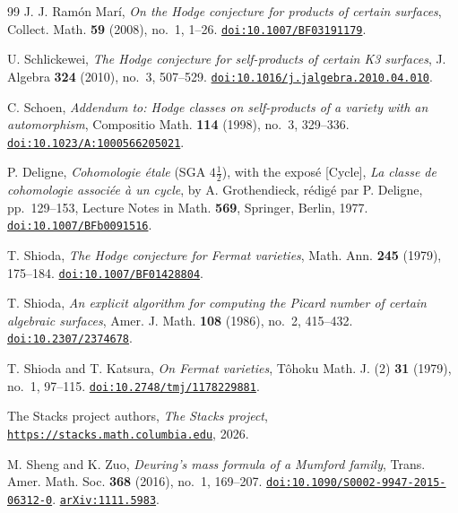 \begin{thebibliography}{99}
J. J. Ram\'on Mar\'i,
\emph{On the Hodge conjecture for products of certain surfaces},
Collect. Math. \textbf{59} (2008), no.~1, 1--26.
\href{https://doi.org/10.1007/BF03191179}{\texttt{doi:10.1007/BF03191179}}.

U. Schlickewei,
\emph{The Hodge conjecture for self-products of certain K3 surfaces},
J. Algebra \textbf{324} (2010), no.~3, 507--529.
\href{https://doi.org/10.1016/j.jalgebra.2010.04.010}{\texttt{doi:10.1016/j.jalgebra.2010.04.010}}.

C. Schoen,
\emph{Addendum to: Hodge classes on self-products of a variety with an
automorphism},
Compositio Math. \textbf{114} (1998), no.~3, 329--336.
\href{https://doi.org/10.1023/A:1000566205021}{\texttt{doi:10.1023/A:1000566205021}}.

P. Deligne,
\emph{Cohomologie \'etale} (SGA $4\frac{1}{2}$), with the expos\'e
[Cycle], \emph{La classe de cohomologie associ\'ee \`a un cycle}, by
A. Grothendieck, r\'edig\'e par P. Deligne, pp.~129--153,
Lecture Notes in Math. \textbf{569}, Springer, Berlin, 1977.
\href{https://doi.org/10.1007/BFb0091516}{\texttt{doi:10.1007/BFb0091516}}.

T. Shioda,
\emph{The Hodge conjecture for Fermat varieties},
Math. Ann. \textbf{245} (1979), 175--184.
\href{https://doi.org/10.1007/BF01428804}{\texttt{doi:10.1007/BF01428804}}.

T. Shioda,
\emph{An explicit algorithm for computing the Picard number of certain
algebraic surfaces},
Amer. J. Math. \textbf{108} (1986), no.~2, 415--432.
\href{https://doi.org/10.2307/2374678}{\texttt{doi:10.2307/2374678}}.

T. Shioda and T. Katsura,
\emph{On Fermat varieties},
T\^ohoku Math. J. (2) \textbf{31} (1979), no.~1, 97--115.
\href{https://doi.org/10.2748/tmj/1178229881}{\texttt{doi:10.2748/tmj/1178229881}}.

The Stacks project authors,
\emph{The Stacks project},
\href{https://stacks.math.columbia.edu}{\texttt{https://stacks.math.columbia.edu}},
2026.

M. Sheng and K. Zuo,
\emph{Deuring's mass formula of a Mumford family},
Trans. Amer. Math. Soc. \textbf{368} (2016), no.~1, 169--207.
\href{https://doi.org/10.1090/S0002-9947-2015-06312-0}%
{\texttt{doi:10.1090/S0002-9947-2015-06312-0}}.
\href{https://arxiv.org/abs/1111.5983}{\texttt{arXiv:1111.5983}}.


\end{thebibliography}
